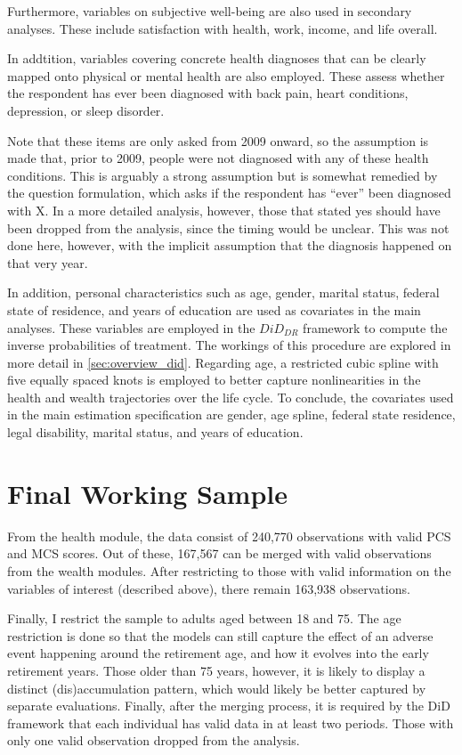Furthermore, variables on subjective well-being are also used in secondary analyses. These include satisfaction
with health, work, income, and life overall.

In addtition, variables covering concrete health diagnoses that can be clearly mapped onto physical or mental
health are also employed. These assess whether the respondent has ever been diagnosed with back pain, heart
conditions, depression, or sleep disorder.

Note that these items are only asked from 2009 onward, so the assumption is made that, prior to 2009, people were
not diagnosed with any of these health conditions. This is arguably a strong assumption but is somewhat remedied by
the question formulation, which asks if the respondent has ``ever'' been diagnosed with X. In a more detailed
analysis, however, those that stated yes should have been dropped from the analysis, since the timing would be
unclear. This was not done here, however, with the implicit assumption that the diagnosis happened on that very
year.

In addition, personal characteristics such as age, gender, marital status, federal state of residence, and years of
education are used as covariates in the main analyses. These variables are employed in the $DiD_{DR}$ framework to
compute the inverse probabilities of treatment. The workings of this procedure are explored in more detail in
\cref{sec:overview_did}. Regarding age, a restricted cubic spline with five equally spaced knots is employed to
better capture nonlinearities in the health and wealth trajectories over the life cycle. To conclude, the
covariates used in the main estimation specification are gender, age spline, federal state residence, legal
disability, marital status, and years of education.


\section{Final Working Sample}

From the health module, the data consist of 240,770 observations with valid PCS and MCS scores. Out of these,
167,567 can be merged with valid observations from the wealth modules. After restricting to those with valid
information on the variables of interest (described above), there remain 163,938 observations.


Finally, I restrict the sample to adults aged between 18 and 75. The age restriction is done so that the models can
still capture the effect of an adverse event happening around the retirement age, and how it evolves into the early
retirement years. Those older than 75 years, however, it is likely to display a distinct (dis)accumulation pattern,
which would likely be better captured by separate evaluations. Finally, after the merging process, it is required
by the DiD framework that each individual has valid data in at least two periods. Those with only one valid
observation dropped from the analysis.


